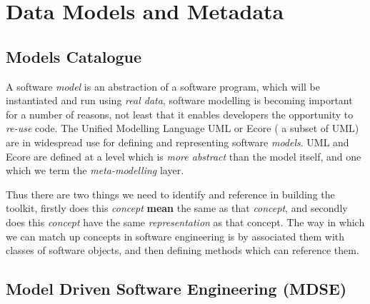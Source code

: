\section{Data Models and Metadata}

\subsection{Models Catalogue}

A software \emph{model} is an abstraction of a software program, which
will be instantiated and run using \emph{real data}, software
modelling is becoming important for a number of reasons, not least
that it enables developers the opportunity to \emph{re-use} code. The
Unified Modelling Language UML \cite{UML} or Ecore \cite{ECORE} ( a
subset of UML) are in widespread use for defining and representing
software \emph{models}. UML and Ecore are defined at a level which is
\emph{more abstract} than the model itself, and one which we term the
\emph{meta-modelling} layer.

Thus there are two things we need to identify and reference in
building the toolkit, firstly does this \emph{concept} \textbf{mean}
the same as that \emph{concept}, and secondly does this \emph{concept}
have the same \emph{representation} as that concept. The way in which
we can match up concepts in software engineering is by associated them
with classes of software objects, and then defining methods which can
reference them.

\subsection{Model Driven Software Engineering (MDSE)}

